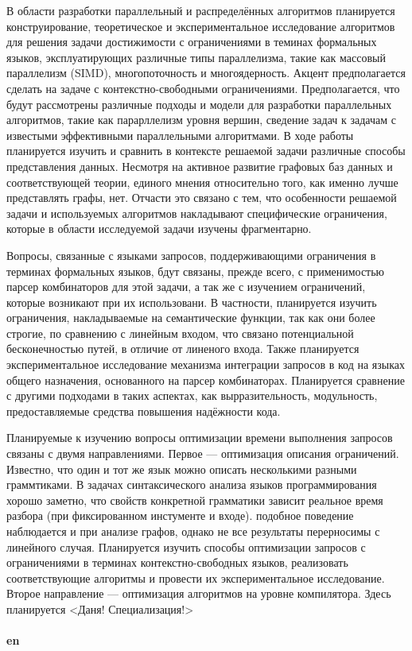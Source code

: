 \documentclass[12pt]{article}  %
\theoremstyle{remark}
\begin{document}
В области разработки параллельный и распределённых алгоритмов планируется конструирование, теоретическое и экспериментальное исследование алгоритмов для решения задачи достижимости с ограничениями в теминах формальных языков, эксплуатирующих различные типы параллелизма, такие как массовый параллелизм (SIMD), многопоточность и многоядерность. Акцент предполагается сделать на задаче с контекстно-свободными ограничениями. Предполагается, что будут рассмотрены различные подходы и модели для разработки параллельных алгоритмов, такие как парарллелизм уровня вершин, сведение задач к задачам с известыми эффективными параллельными алгоритмами. В ходе работы планируется изучить и сравнить в контексте решаемой задачи различные способы представления данных. Несмотря на активное развитие графовых баз данных и соответствующей теории, единого мнения относительно того, как именно лучше представлять графы, нет. Отчасти это связано с тем, что особенности решаемой задачи и используемых алгоритмов накладывают специфические ограничения, которые в области исследуемой задачи изучены фрагментарно.

Вопросы, связанные с языками запросов, поддерживающими ограничения в терминах формальных языков, бдут связаны, прежде всего, с применимостью парсер комбинаторов для этой задачи, а так же с изучением ограничений, которые возникают при их использовани. В частности, планируется изучить ограничения, накладываемые на семантические функции, так как они более строгие, по сравнению с линейным входом, что связано потенциальной бесконечностью путей, в отличие от линеного входа. Также планируется экспериментальное исследование механизма интеграции запросов в код на языках общего назначения, основанного на парсер комбинаторах. Планируется сравнение с другими подходами в таких аспектах, как вырразительность, модульность, предоставляемые средства повышения надёжности кода.

Планируемые к изучению вопросы оптимизации времени выполнения запросов связаны с двумя направлениями. Первое --- оптимизация описания ограничений. Известно, что один и тот же язык можно описать несколькими разными граммтиками. В задачах синтаксического анализа языков программирования хорошо заметно, что свойств конкретной грамматики зависит реальное время разбора (при фиксированном инстументе и входе). подобное поведение наблюдается и при анализе графов, однако не все результаты перерносимы с линейного случая. Планируется изучить способы оптимизации запросов с ограничениями в терминах контекстно-свободных языков, реализовать соответствующие алгоритмы и провести их экспериментальное исследование. Второе направление --- оптимизация алгоритмов на уровне компилятора. Здесь планируется {\huge<Даня! Специализация!>}
\\
\\
\textbf{en}\\
\end{document}
